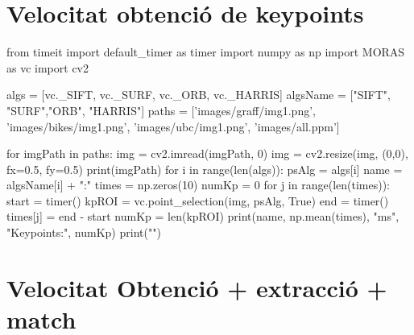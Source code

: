 \section{Velocitat obtenció de keypoints}

\begin{python}
from timeit import default_timer as timer
import numpy as np
import MORAS as vc
import cv2

algs = [vc._SIFT, vc._SURF, vc._ORB, vc._HARRIS]
algsName = ["SIFT", "SURF","ORB", "HARRIS"]
paths = ['images/graff/img1.png', 'images/bikes/img1.png', 'images/ubc/img1.png', 'images/all.ppm']

for imgPath in paths:
	img = cv2.imread(imgPath, 0)
	img = cv2.resize(img, (0,0), fx=0.5, fy=0.5)
	print(imgPath)
	for i in range(len(algs)):
		psAlg = algs[i]
		name = algsName[i] + ":"
		times = np.zeros(10)
		numKp = 0
		for j in range(len(times)):
			start = timer()
			kpROI = vc.point_selection(img, psAlg, True)
			end = timer()
			times[j] = end - start
			numKp = len(kpROI)
		print(name, np.mean(times), "ms", "Keypoints:", numKp)
	print("\n")
\end{python}

\section{Velocitat Obtenció + extracció + match}


